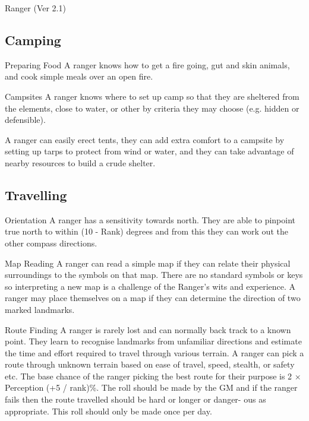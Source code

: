 \begin{Chapter}{Ranger (Ver 2.1)}
\begin{Description}
\end{Description}

\subsection{Camping}

\begin{Description}

\item[Preparing Food] A ranger knows how to get a fire going, gut and
  skin animals, and cook simple meals over an open fire.

\item[Campsites] A ranger knows where to set up camp so that they are
  sheltered from the elements, close to water, or other by criteria
  they may choose (e.g. hidden or defensible).

  A ranger can easily erect tents, they can add extra comfort to a
  campsite by setting up tarps to protect from wind or water, and they
  can take advantage of nearby resources to build a crude shelter.

\end{Description}

\subsection{Travelling}

\begin{Description}

\item[Orientation] A ranger has a sensitivity towards north. They are
  able to pinpoint true north to within (10 - Rank) degrees and from
  this they can work out the other compass directions.

\item[Map Reading] A ranger can read a simple map if they can relate
  their physical surroundings to the symbols on that map.  There are
  no standard symbols or keys so interpreting a new map is a challenge
  of the Ranger’s wits and experience.  A ranger may place themselves
  on a map if they can determine the direction of two marked
  landmarks.

\item[Route Finding] A ranger is rarely lost and can normally back
  track to a known point.  They learn to recognise landmarks from
  unfamiliar directions and estimate the time and effort required to
  travel through various terrain.  A ranger can pick a route through
  unknown terrain based on ease of travel, speed, stealth, or safety
  etc. The base chance of the ranger picking the best route for their
  purpose is 2 × Perception (+5 / rank)\%.  The roll should be made by
  the GM and if the ranger fails then the route travelled should be
  hard or longer or danger- ous as appropriate.  This roll should only
  be made once per day.


\end{Description}
\end{Chapter}
